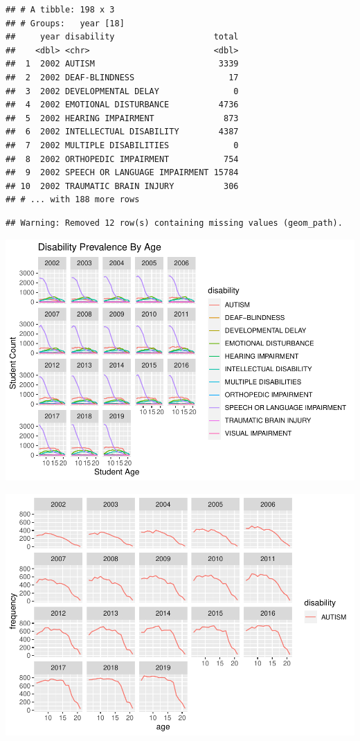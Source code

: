 \documentclass[
  english,
  man]{apa6}
\begin{document}
\begin{verbatim}
## # A tibble: 198 x 3
## # Groups:   year [18]
##     year disability                    total
##    <dbl> <chr>                         <dbl>
##  1  2002 AUTISM                         3339
##  2  2002 DEAF-BLINDNESS                   17
##  3  2002 DEVELOPMENTAL DELAY               0
##  4  2002 EMOTIONAL DISTURBANCE          4736
##  5  2002 HEARING IMPAIRMENT              873
##  6  2002 INTELLECTUAL DISABILITY        4387
##  7  2002 MULTIPLE DISABILITIES             0
##  8  2002 ORTHOPEDIC IMPAIRMENT           754
##  9  2002 SPEECH OR LANGUAGE IMPAIRMENT 15784
## 10  2002 TRAUMATIC BRAIN INJURY          306
## # ... with 188 more rows
\end{verbatim}

\begin{verbatim}
## Warning: Removed 12 row(s) containing missing values (geom_path).
\end{verbatim}

\includegraphics{draft_play_files/figure-latex/Oregon plot-1.pdf}

\includegraphics{draft_play_files/figure-latex/unnamed-chunk-1-1.pdf}
\end{document}
